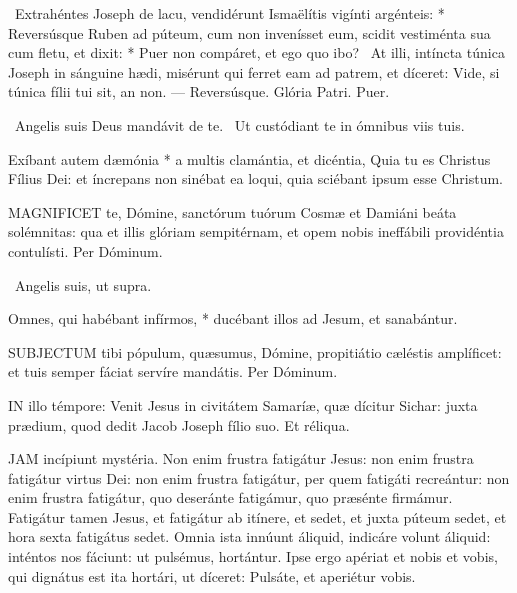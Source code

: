 \R\ Extrahéntes Joseph de lacu, vendidérunt Ismaëlítis vigínti argénteis: * Reversúsque Ruben ad púteum, cum non invenísset eum, scidit vestiménta sua cum fletu, et dixit: * Puer non compáret, et ego quo ibo? \V\ At illi, intíncta túnica Joseph in sánguine hædi, misérunt qui ferret eam ad patrem, et díceret: Vide, si túnica fílii tui sit, an non. --- Reversúsque. Glória Patri. Puer.

\V\ Angelis suis Deus mandávit de te. \R\ Ut custódiant te in ómnibus viis tuis.

 Exíbant autem dæmónia * a multis clamántia, et dicéntia, Quia tu es Christus Fílius Dei: et íncrepans non sinébat ea loqui, quia sciébant ipsum esse Christum.


\lettrine[lines=2]{M}{AGNIFICET} te, Dómine, sanctórum tuórum Cosmæ et Damiáni beáta solémnitas: qua et illis glóriam sempitérnam, et opem nobis ineffábili providéntia contulísti. Per Dóminum.

\V\ Angelis suis, ut supra.

 Omnes, qui habébant infírmos, * ducébant illos ad Jesum, et sanabántur.


\lettrine[lines=2]{S}{UBJECTUM} tibi pópulum, quæsumus, Dómine, propitiátio cæléstis amplíficet: et tuis semper fáciat servíre mandátis. Per Dóminum.

\sectionornament




\lettrine[lines=2]{I}{N} illo témpore: Venit Jesus in civitátem Samaríæ, quæ dícitur Sichar: juxta prædium, quod dedit Jacob Joseph fílio suo. Et réliqua.



\lettrine[lines=2]{J}{AM} incípiunt mystéria. Non enim frustra fatigátur Jesus: non enim frustra fatigátur virtus Dei: non enim frustra fatigátur, per quem fatigáti recreántur: non enim frustra fatigátur, quo deseránte fatigámur, quo præsénte firmámur. Fatigátur tamen Jesus, et fatigátur ab itínere, et sedet, et juxta púteum sedet, et hora sexta fatigátus sedet. Omnia ista innúunt áliquid, indicáre volunt áliquid: inténtos nos fáciunt: ut pulsémus, hortántur. Ipse ergo apériat et nobis et vobis, qui dignátus est ita hortári, ut díceret: Pulsáte, et aperiétur vobis.

